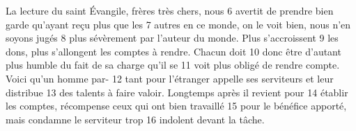 La lecture du saint Évangile, frères très chers, nous	 
6	 	avertit de prendre bien garde qu'ayant reçu plus que les	 
7	 	autres en ce monde, on le voit bien, nous n'en soyons jugés	 
8	 	plus sévèrement par l'auteur du monde. Plus s'accroissent	 
9	 	les dons, plus s'allongent les comptes à rendre. Chacun doit	 
10	 	donc être d'autant plus humble du fait de sa charge qu'il se	 
11	 	voit plus obligé de rendre compte. Voici qu'un homme par-	 
12	 	tant pour l'étranger appelle ses serviteurs et leur distribue	 
13	 	des talents à faire valoir. Longtemps après il revient pour	 
14	 	établir les comptes, récompense ceux qui ont bien travaillé	 
15	 	pour le bénéfice apporté, mais condamne le serviteur trop	 
16	 	indolent devant la tâche.